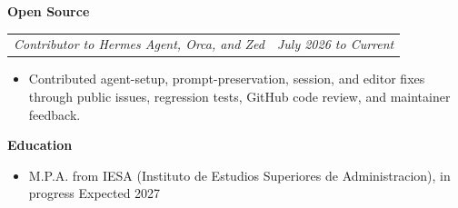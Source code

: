 \documentclass[10pt,letterpaper]{article}
\makeatletter
\newcommand{\bodyfont}{\fontsize{10.5}{15.75}\selectfont}
\newcommand{\sectiontitle}[1]{%
  \vspace{4pt}
  {\bodyfont\textbf{#1}}\par
  \nopagebreak[4]
  \vspace{2pt}
}
\newcommand{\roleline}[2]{%
  \begin{tabularx}{\textwidth}{@{}Xr@{}}
    \bodyfont\textit{#1} & \bodyfont\textit{#2}
  \end{tabularx}
  \nopagebreak[4]
  \vspace{1pt}
}
\makeatother
\begin{document}
\sectiontitle{Open Source}

\roleline{Contributor to Hermes Agent, Orca, and Zed}{July 2026 to Current}
\begin{itemize}
  \item Contributed agent-setup, prompt-preservation, session, and editor fixes through public issues, regression tests, GitHub code review, and maintainer feedback.
\end{itemize}

\sectiontitle{Education}
\begin{itemize}
  \item M.P.A. from IESA (Instituto de Estudios Superiores de Administracion), in progress \hfill Expected 2027
\end{itemize}
\end{document}
